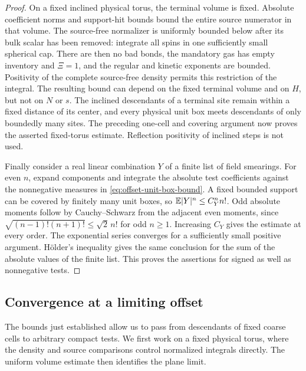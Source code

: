 \begin{proof}
On a fixed inclined physical torus, the terminal volume is fixed.
Absolute coefficient norms and support-hit bounds bound the entire
source numerator in that volume.  The source-free normalizer is
uniformly bounded below after its bulk scalar has been removed:
integrate all spins in one sufficiently small spherical cap.  There
are then no bad bonds, the mandatory gas has empty inventory and
$\Xi=1$, and the regular and kinetic exponents are bounded.  Positivity
of the complete source-free density permits this restriction of the
integral.  The resulting bound can depend on the fixed terminal volume
and on $H$, but not on $N$ or $s$.  The inclined descendants of a
terminal site remain within a fixed distance of its center, and every
physical unit box meets descendants of only boundedly many sites.
The preceding one-cell and covering argument now proves the asserted
fixed-torus estimate.  Reflection positivity of inclined steps is not
used.

Finally consider a real linear combination $Y$ of a finite list of
field smearings.  For even $n$, expand components and integrate the
absolute test coefficients against the nonnegative measures in
\eqref{eq:offset-unit-box-bound}.  A fixed bounded support can be
covered by finitely many unit boxes, so
$\mathbb E|Y|^n\le C_Y^n n!$.  Odd absolute moments follow by Cauchy--Schwarz
from the adjacent even moments, since
$\sqrt{(n-1)!(n+1)!}\le\sqrt2\,n!$ for odd $n\ge1$.
Increasing $C_Y$ gives the estimate at every order.  The exponential
series converges for a sufficiently small positive argument.
H\"older's inequality gives the same conclusion for the sum of the
absolute values of the finite list.  This proves the assertions for
signed as well as nonnegative tests.
\end{proof}

\subsection{Convergence at a limiting offset}

The bounds just established allow us to pass from descendants of fixed
coarse cells to arbitrary compact tests.  We first work on a fixed
physical torus, where the density and source comparisons control
normalized integrals directly.  The uniform volume estimate then
identifies the plane limit.

